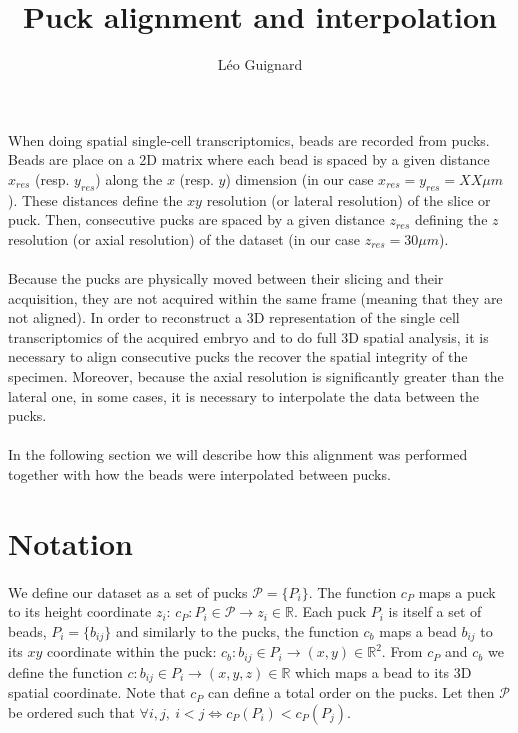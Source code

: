 \documentclass[10pt,a4paper]{article}
\author{L\'eo Guignard}
\title{Puck alignment and interpolation}
\begin{document}
\maketitle
\paragraph{}When doing spatial single-cell transcriptomics, beads are recorded from pucks.
Beads are place on a 2D matrix where each bead is spaced by a given distance $x_{res}$ (resp.
$y_{res}$) along the $x$ (resp.
$y$) dimension (in our case $x_{res}=y_{res}=XX \mu m$).
These distances define the $xy$ resolution (or lateral resolution) of the slice or puck.
Then, consecutive pucks are spaced by a given distance $z_{res}$ defining the $z$ resolution (or axial resolution) of the dataset (in our case $z_{res}=30\mu m$).
\paragraph{}Because the pucks are physically moved between their slicing and their acquisition, they are not acquired within the same frame (meaning that they are not aligned).
In order to reconstruct a 3D representation of the single cell transcriptomics of the acquired embryo and to do full 3D spatial analysis, it is necessary to align consecutive pucks the recover the spatial integrity of the specimen.
Moreover, because the axial resolution is significantly greater than the lateral one, in some cases, it is necessary to interpolate the data between the pucks.
\paragraph{}In the following section we will describe how this alignment was performed together with how the beads were interpolated between pucks.
\section{Notation}
\paragraph{}We define our dataset as a set of pucks \(\mathcal{P}=\{P_i\}\).
The function $c_P$ maps a puck to its height coordinate $z_i$: \(c_P: P_i\in \mathcal{P} \rightarrow z_i \in \mathbb{R}\).
Each puck $P_i$ is itself a set of beads, \(P_i=\{b_{ij}\}\) and similarly to the pucks, the function \(c_b\) maps a bead \(b_{ij}\) to its \(xy\) coordinate within the puck: \(c_b:b_{ij}\in P_i\rightarrow (x,y)\in \mathbb{R}^2\).
From \(c_P\) and \(c_b\) we define the function \(c:b_{ij}\in P_i\rightarrow (x,y,z)\in\mathbb{R}\) which maps a bead to its 3D spatial coordinate.
Note that \(c_P\) can define a total order on the pucks.
Let then \(\mathcal{P}\) be ordered such that \(\forall i,j,~i<j\iff c_P(P_i)<c_P(P_j)\).
%
\end{document}
